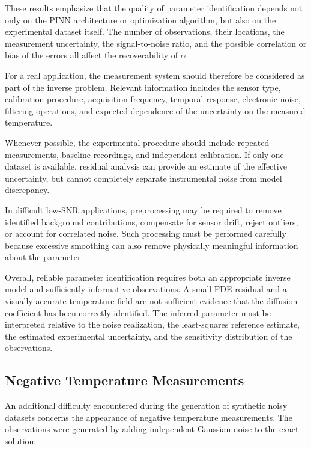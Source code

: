 These results emphasize that the quality of parameter identification depends
not only on the PINN architecture or optimization algorithm, but also on the
experimental dataset itself. The number of observations, their locations, the
measurement uncertainty, the signal-to-noise ratio, and the possible
correlation or bias of the errors all affect the recoverability of $\alpha$.

For a real application, the measurement system should therefore be considered
as part of the inverse problem. Relevant information includes the sensor type,
calibration procedure, acquisition frequency, temporal response, electronic
noise, filtering operations, and expected dependence of the uncertainty on the
measured temperature.

Whenever possible, the experimental procedure should include repeated
measurements, baseline recordings, and independent calibration. If only one
dataset is available, residual analysis can provide an estimate of the
effective uncertainty, but cannot completely separate instrumental noise from
model discrepancy.

In difficult low-SNR applications, preprocessing may be required to remove
identified background contributions, compensate for sensor drift, reject
outliers, or account for correlated noise. Such processing must be performed
carefully because excessive smoothing can also remove physically meaningful
information about the parameter.

Overall, reliable parameter identification requires both an appropriate inverse
model and sufficiently informative observations. A small PDE residual and a
visually accurate temperature field are not sufficient evidence that the
diffusion coefficient has been correctly identified. The inferred parameter
must be interpreted relative to the noise realization, the least-squares
reference estimate, the estimated experimental uncertainty, and the
sensitivity distribution of the observations.

\subsection{Negative Temperature Measurements}

An additional difficulty encountered during the generation of synthetic noisy datasets concerns the appearance of negative temperature measurements. The observations were generated by adding independent Gaussian noise to the exact solution:


